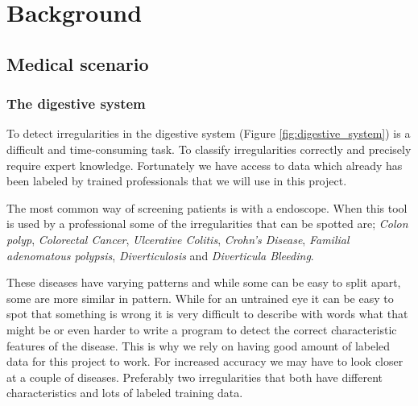 \documentclass[thesis.tex]{subfiles}
\begin{document}
\chapter{Background}


\section{Medical scenario} \label{medicalscenario}


\subsection{The digestive system}  \label{the_digestive_system}
To detect irregularities in the digestive system (Figure \ref{fig:digestive_system}) is a difficult and time-consuming task. To classify irregularities correctly and precisely require expert knowledge. Fortunately we have access to data which already has been labeled by trained professionals that we will use in this project.

The most common way of screening patients is with a endoscope. When this tool is used by a professional some of the irregularities that can be spotted are; \textit{Colon polyp}, \textit{Colorectal Cancer}, \textit{Ulcerative Colitis}, \textit{Crohn's Disease}, \textit{Familial adenomatous polypsis}, \textit{Diverticulosis} and \textit{Diverticula Bleeding}. 

These diseases have varying patterns and while some can be easy to split apart, some are more similar in pattern. While for an untrained eye it can be easy to spot that something is wrong it is very difficult to describe with words what that might be or even harder to write a program to detect the correct characteristic features of the disease. This is why we rely on having good amount of labeled data for this project to work. For increased accuracy we may have to look closer at a couple of diseases. Preferably two irregularities that both have different characteristics and lots of labeled training data.
\end{document}
